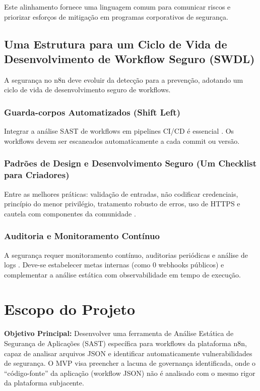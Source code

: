 \documentclass{sftex}
\begin{document}
Este alinhamento fornece uma linguagem comum para comunicar riscos e priorizar esforços de mitigação em programas corporativos de segurança.

\subsection{Uma Estrutura para um Ciclo de Vida de Desenvolvimento de Workflow Seguro (SWDL)}

A segurança no n8n deve evoluir da detecção para a prevenção, adotando um ciclo de vida de desenvolvimento seguro de workflows.

\subsubsection{Guarda-corpos Automatizados (Shift Left)}

Integrar a análise SAST de workflows em pipelines CI/CD é essencial \cite{gitlab_sast}. Os workflows devem ser escaneados automaticamente a cada commit ou versão.

\subsubsection{Padrões de Design e Desenvolvimento Seguro (Um Checklist para Criadores)}

Entre as melhores práticas: validação de entradas, não codificar credenciais, princípio do menor privilégio, tratamento robusto de erros, uso de HTTPS e cautela com componentes da comunidade \cite{n8n_best_practices_reddit}.

\subsubsection{Auditoria e Monitoramento Contínuo}

A segurança requer monitoramento contínuo, auditorias periódicas e análise de logs \cite{owasp_source_code_analysis}. Deve-se estabelecer metas internas (como 0 webhooks públicos) e complementar a análise estática com observabilidade em tempo de execução.

\newpage

\section{Escopo do Projeto}

\textbf{Objetivo Principal:} Desenvolver uma ferramenta de Análise Estática de Segurança de Aplicações (SAST) específica para workflows da plataforma n8n, capaz de analisar arquivos JSON e identificar automaticamente vulnerabilidades de segurança. O MVP visa preencher a lacuna de governança identificada, onde o “código-fonte” da aplicação (workflow JSON) não é analisado com o mesmo rigor da plataforma subjacente.
\end{document}
